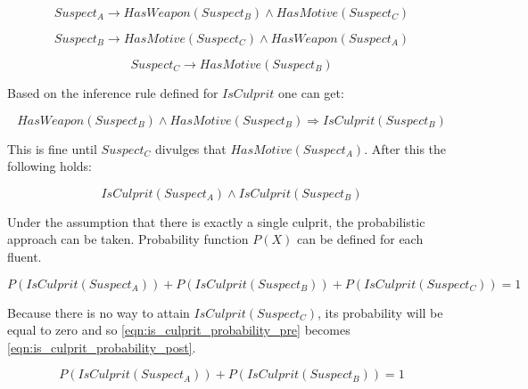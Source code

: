 \begin{equation}
    Suspect_A \rightarrow HasWeapon \left( Suspect_B \right) \land HasMotive \left( Suspect_C \right)
\end{equation}

\begin{equation}
    Suspect_B \rightarrow HasMotive \left( Suspect_C \right) \land HasWeapon \left( Suspect_A \right)
\end{equation}

\begin{equation}
    Suspect_C \rightarrow HasMotive \left( Suspect_B \right)
\end{equation}

Based on the inference rule defined for $IsCulprit$ one can get:

\begin{equation}
    HasWeapon \left( Suspect_B \right) \land HasMotive \left( Suspect_B \right) \Rightarrow  IsCulprit \left( Suspect_B \right)
\end{equation}

This is fine until $Suspect_C$ divulges that $HasMotive \left( Suspect_A \right)$.
After this the following holds:

\begin{equation}
    IsCulprit \left( Suspect_A \right) \land IsCulprit \left( Suspect_B \right)
\end{equation}

Under the assumption that there is exactly a single culprit, the probabilistic approach can be taken.
Probability function $P(X)$ can be defined for each fluent.

\begin{equation}
    \label{eqn:is_culprit_probability_pre}
    P \left( IsCulprit \left( Suspect_A \right) \right) + P \left( IsCulprit \left( Suspect_B \right) \right) + P \left( IsCulprit \left( Suspect_C \right) \right) = 1
\end{equation}

Because there is no way to attain $IsCulprit \left( Suspect_C \right)$, its probability will be equal to zero and so \ref{eqn:is_culprit_probability_pre} becomes \ref{eqn:is_culprit_probability_post}.

\begin{equation}
    \label{eqn:is_culprit_probability_post}
    P \left( IsCulprit \left( Suspect_A \right) \right) + P \left( IsCulprit \left( Suspect_B \right) \right) = 1
\end{equation}

